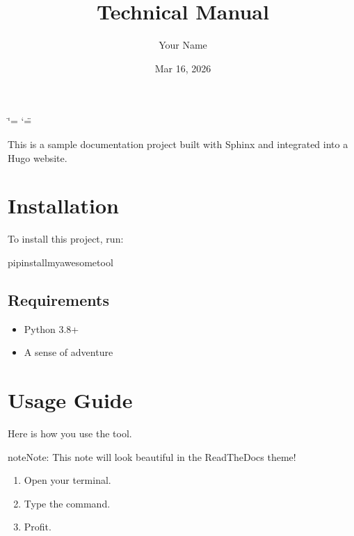 \documentclass[a4paper,10pt,english]{sphinxmanual}
\title{Technical Manual}
\date{Mar 16, 2026}
\author{Your Name}
\begin{document}
\ifdefined\shorthandoff
  \ifnum\catcode`\=\string=\active\shorthandoff{=}\fi
  \ifnum\catcode`\"=\active{}\fi
\fi

\pagestyle{empty}
\sphinxmaketitle
\pagestyle{plain}
\sphinxtableofcontents
\pagestyle{normal}
\label{\detokenize{index::doc}}


\sphinxAtStartPar
This is a sample documentation project built with Sphinx and integrated
into a Hugo website.

\sphinxstepscope


\chapter{Installation}
\label{\detokenize{installation:installation}}\label{\detokenize{installation::doc}}
\sphinxAtStartPar
To install this project, run:

\begin{sphinxVerbatim}[commandchars=\\\{\}]
pipinstallmy\PYGZhy{}awesome\PYGZhy{}tool
\end{sphinxVerbatim}


\section{Requirements}
\label{\detokenize{installation:requirements}}\begin{itemize}
\item {} 
\sphinxAtStartPar
Python 3.8+

\item {} 
\sphinxAtStartPar
A sense of adventure

\end{itemize}

\sphinxstepscope


\chapter{Usage Guide}
\label{\detokenize{usage:usage-guide}}\label{\detokenize{usage::doc}}
\sphinxAtStartPar
Here is how you use the tool.

\begin{sphinxadmonition}{note}{Note:}
\sphinxAtStartPar
This note will look beautiful in the ReadTheDocs theme!
\end{sphinxadmonition}
\begin{enumerate}
%
\item {} 
\sphinxAtStartPar
Open your terminal.

\item {} 
\sphinxAtStartPar
Type the command.

\item {} 
\sphinxAtStartPar
Profit.

\end{enumerate}
\end{document}
